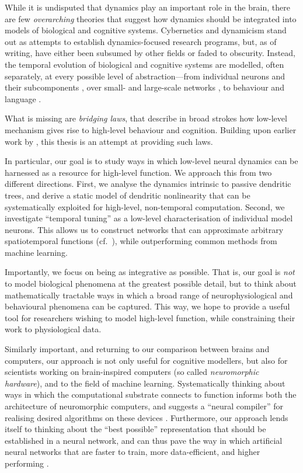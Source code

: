 While it is undisputed that dynamics play an important role in the brain, there are few \emph{overarching} theories that suggest how dynamics should be integrated into models of biological and cognitive systems.
Cybernetics \citep{wiener1948cybernetics} and dynamicism \citep{vangelder1998dynamical,eliasmith1996third} stand out as attempts to establish dynamics-focused research programs, but, as of writing, have either been subsumed by other fields or faded to obscurity.
Instead, the temporal evolution of biological and cognitive systems are modelled, often separately, at every possible level of abstraction---from individual neurons and their subcomponents \citep[e.g.,][]{gerstner2002spiking,izhikevich2007dynamical}, over small- and large-scale networks \citep[e.g.,][]{gerstner2014neuronal,bassett2017network}, to behaviour and language \citep[e.g.,][]{anderson1997actr,debot2007dynamic}.

What is missing are \emph{bridging laws}, that describe in broad strokes how low-level mechanism gives rise to high-level behaviour and cognition.
Building upon earlier work by \citet{eliasmith2003neural}, this thesis is an attempt at providing such laws.

In particular, our goal is to study ways in which low-level neural dynamics can be harnessed as a resource for high-level function.
We approach this from two different directions.
First, we analyse the dynamics intrinsic to passive dendritic trees, and derive a static model of dendritic nonlinearity that can be systematically exploited for high-level, non-temporal computation.
Second, we investigate \enquote{temporal tuning} as a low-level characterisation of individual model neurons.
This allows us to construct networks that can approximate arbitrary spatiotemporal functions (cf.~), while outperforming common methods from machine learning.

Importantly, we focus on being as integrative as possible.
That is, our goal is \emph{not} to model biological phenomena at the greatest possible detail, but to think about mathematically tractable ways in which a broad range of neurophysiological and behavioural phenomena can be captured.
This way, we hope to provide a useful tool for researchers wishing to model high-level function, while constraining their work to physiological data.

Similarly important, and returning to our comparison between brains and computers, our approach is not only useful for cognitive modellers, but also for scientists working on brain-inspired computers (so called \emph{neuromorphic hardware}), and to the field of machine learning.
Systematically thinking about ways in which the computational substrate connects to function informs both the architecture of neuromorphic computers, and suggests a \enquote{neural compiler} for realising desired algorithms on these devices \citep{boahen2017neuromorph,voelker2021programming}.
Furthermore, our approach lends itself to thinking about the \enquote{best possible} representation that should be established in a neural network, and can thus pave the way in which artificial neural networks that are faster to train, more data-efficient, and higher performing \citep{voelker2019lmu,chilkuri2021parallelizing}.

